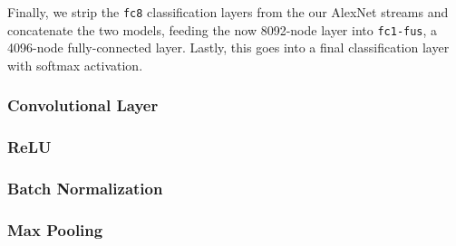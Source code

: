 Finally, we strip the \texttt{fc8} classification layers from the our AlexNet streams and concatenate the two models, feeding the now 8092-node layer into \texttt{fc1-fus}, a 4096-node fully-connected layer. Lastly, this goes into a final classification layer with softmax activation.

\subsubsection{Convolutional Layer}

\subsubsection{ReLU}

\subsubsection{Batch Normalization}

\subsubsection{Max Pooling}





